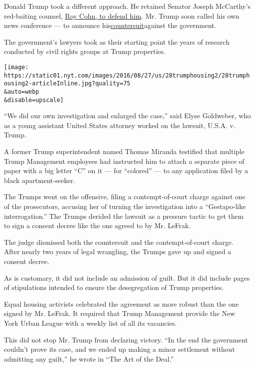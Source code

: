 Donald Trump took a different approach. He retained Senator Joseph
McCarthy's red-baiting counsel,
\href{http://www.nytimes.com/2016/06/21/us/politics/donald-trump-roy-cohn.html}{Roy
Cohn, to defend him}. Mr. Trump soon called his own news conference ---
to announce
his\href{http://www.nytimes.com/1973/12/13/archives/realty-company-asks-100million-bias-damages-no-names-or-addresses.html}{countersuit}against
the government.

The government's lawyers took as their starting point the years of
research conducted by civil rights groups at Trump properties.

\texttt{[image: https://static01.nyt.com/images/2016/08/27/us/28trumphousing2/28trumphousing2-articleInline.jpg?quality=75\\\&auto=webp\\\&disable=upscale]}

``We did our own investigation and enlarged the case,'' said Elyse
Goldweber, who as a young assistant United States attorney worked on the
lawsuit, U.S.A. v. Trump.

A former Trump superintendent named Thomas Miranda testified that
multiple Trump Management employees had instructed him to attach a
separate piece of paper with a big letter ``C'' on it --- for
``colored'' --- to any application filed by a black apartment-seeker.

The Trumps went on the offensive, filing a contempt-of-court charge
against one of the prosecutors, accusing her of turning the
investigation into a ``Gestapo-like interrogation.'' The Trumps derided
the lawsuit as a pressure tactic to get them to sign a consent decree
like the one agreed to by Mr. LeFrak.

The judge dismissed both the countersuit and the contempt-of-court
charge. After nearly two years of legal wrangling, the Trumps gave up
and signed a consent decree.

As is customary, it did not include an admission of guilt. But it did
include pages of stipulations intended to ensure the desegregation of
Trump properties.

Equal housing activists celebrated the agreement as more robust than the
one signed by Mr. LeFrak. It required that Trump Management provide the
New York Urban League with a weekly list of all its vacancies.

This did not stop Mr. Trump from declaring victory. ``In the end the
government couldn't prove its case, and we ended up making a minor
settlement without admitting any guilt,'' he wrote in ``The Art of the
Deal.''

